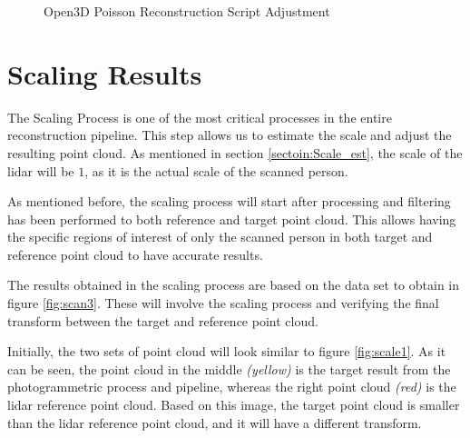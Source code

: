 \documentclass[12pt]{report}
\begin{document}
\begin{figure}[H]
\caption{Open3D Poisson Reconstruction Script Adjustment}
\label{fig:open3dpossionscreipt_result} 
\end{figure}


\newpage
\section{Scaling Results}
\label{section:scale_res}

The Scaling Process is one of the most critical processes in the entire reconstruction pipeline. 
This step allows us to estimate the scale and adjust the resulting point cloud.
As mentioned in section \ref{sectoin:Scale_est}, the scale of the lidar will be  $1$, as it is the actual scale of the scanned person. 

As mentioned before, the scaling process will start after processing and filtering has been performed to both reference and target point cloud.
This allows having the specific regions of interest of only the scanned person in both target and reference point cloud to have accurate results.

The results obtained in the scaling process are based on the data set to obtain in figure \ref{fig:scan3}.
These will involve the scaling process and verifying the final transform between the target and reference point cloud. 

Initially,  the two sets of point cloud will look similar to figure \ref{fig:scale1}. 
As it can be seen, the point cloud in the middle \textit{(yellow)} is the target result from the photogrammetric process and pipeline, whereas the right point cloud \textit{(red)} is the lidar reference point cloud.
Based on this image, the target point cloud is smaller than the lidar reference point cloud, and it will have a different transform. 
\end{document}
